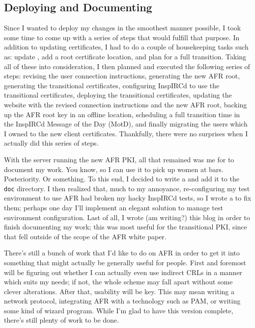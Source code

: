 \documentclass{article}
\begin{document}
\subsection{Deploying and Documenting}
Since I wanted to deploy my changes in the smoothest manner possible, I took some time to come up with a series of steps that would fulfill that purpose.  In addition to updating certificates, I had to do a couple of housekeeping tasks such as: update , add a root certificate location, and plan for a full transition.  Taking all of these into consideration, I then planned and executed the following series of steps: revising the user connection instructions, generating the new AFR root, generating the transitional certificates, configuring InspIRCd to use the transitional certificates, deploying the transitional certificates, updating the website with the revised connection instructions and the new AFR root, backing up the AFR root key in an offline location, scheduling a full transition time in the InspIRCd Message of the Day (MotD), and finally migrating the users which I owned to the new client certificates.  Thankfully, there were no surprises when I actually did this series of steps.

With the server running the new AFR PKI, all that remained was me for to document my work.  You know, so I can use it to pick up women at bars.  Posteriority.  Or something.  To this end, I decided to write a  and add it to the  \texttt{doc} directory.  I then realized that, much to my annoyance, re-configuring my test environment to use AFR had broken my hacky InspIRCd tests, so I wrote a  to fix them; perhaps one day I'll implement an elegant solution to manage test environment configuration.  Last of all, I wrote (am writing?) this blog in order to finish documenting my work; this was most useful for the transitional PKI, since that fell outside of the scope of the AFR white paper.

There's still a bunch of work that I'd like to do on AFR in order to get it into something that might actually be generally useful for people.  First and foremost will be figuring out whether I can actually even use indirect CRLs in a manner which suits my needs; if not, the whole scheme may fall apart without some clever alterations.  After that, usability will be key.  This may mean writing a network protocol, integrating AFR with a technology such as PAM, or writing some kind of wizard program.  While I'm glad to have this version complete, there's still plenty of work to be done.
\end{document}
